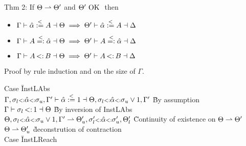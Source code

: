 \documentclass{report}
\begin{document}
Thm 2:
If $\Theta \rightharpoonup \Theta'$ and $\Theta' \text{ OK }$ then
\begin{itemize}
\item $\Gamma \vdash \hat{\alpha} \overset{<}{:=} A \dashv \Theta \implies \Theta' \vdash \hat{\alpha} \overset{<}{:=} A \dashv \Delta$
\item $\Gamma \vdash A \overset{<}{=:} \hat{\alpha} \dashv \Theta \implies \Theta' \vdash A \overset{<}{=:} \hat{\alpha} \dashv \Delta$
\item $\Gamma \vdash A \st B \dashv \Theta \implies \Theta' \vdash A \st B \dashv \Delta$
\end{itemize}
Proof by rule induction and on the size of $\Gamma$.
\begin{tabbing}
Case \=InstLAbs\\
\>$\Gamma,\sigma_{l} {\scriptstyle{<:}} \hat{\alpha} {\scriptstyle{<:}} \sigma_{u},\Gamma' \vdash \hat{\alpha} \overset{<}{:=} 1 \dashv \Theta,\sigma_{l} {\scriptstyle{<:}} \hat{\alpha} {\scriptstyle{<:}} \sigma_{u} \vee 1,\Gamma'$ \` By assumption\\
\>$\Gamma \vdash \botbound \st 1 \dashv \Theta$ \` By inversion of InstLAbs\\
\>$\Theta,\sigma_{l} {\scriptstyle{<:}} \hat{\alpha} {\scriptstyle{<:}} \sigma_{u} \vee 1,\Gamma' \rightharpoonup \Theta_u',\sigma_{l}' {\scriptstyle{<:}} \hat{\alpha} {\scriptstyle{<:}} \sigma_{u}',\Theta'_l$ \` Continuity of existence on $\Theta \rightharpoonup \Theta'$\\
\>$\Theta \rightharpoonup \Theta_u'$ \` deconstrution of contraction\\
Case \=InstLReach\\
\end{tabbing}
\end{document}
